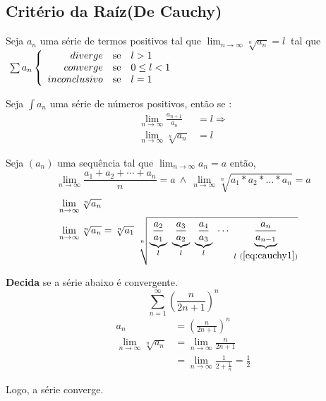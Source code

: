 \documentclass[12pt,openany, letterpaper]{book}
\begin{document}
\subsection{Critério da Raíz(De Cauchy)}

\hspace{5mm} Seja $a_n$ uma série de termos positivos tal que $\displaystyle{\lim_{n \rightarrow \infty} \sqrt[n]{a_n} = l}\  $ tal que $\ \sum a_n  \left\{ \begin{array}{rlll}
diverge & \hbox{se} &  l > 1 \\
converge & \hbox{se} & 0 \leq l < 1 \\
inconclusivo & \hbox{se} & l = 1 \\
\end{array}\right.$

Seja $\int a_n$ uma série de números positivos, então se :
\begin{align}
\lim_{n \rightarrow \infty} \frac{a_{n+1}}{a_n} &= l \Rightarrow \label{eq:cauchy1} \\
\lim_{n \rightarrow \infty} \sqrt[n]{a_n} &= l
\end{align}

Seja $(a_n)$ uma sequência tal que $\displaystyle{\lim_{n \rightarrow \infty} a_n = a}$ então,  $$\lim_{n \rightarrow \infty} \frac{a_1 + a_2 + \cdots + a_n}{n} = a \ \land \ \lim_{n \rightarrow \infty} \sqrt[n]{a_1 * a_2 * \hdots * a_n} = a$$
\begin{align*}
\lim_{n \rightarrow \infty} \sqrt[n]{a_n} \\
\lim_{n \rightarrow \infty} \sqrt[n]{a_n} &= \sqrt[n]{a_1} \ \sqrt[n]{\underbrace{\frac{a_2}{a_1}}_l\ \underbrace{\frac{a_3}{a_2}}_l \ \underbrace{\frac{a_4}{a_3}}_l \ \cdots \ \underbrace{\frac{a_n}{a_{n-1}}}_{l \ (\ref{eq:cauchy1})}}
\end{align*}

\textbf{Decida} se a série abaixo é convergente. $$\sum_{n = 1}^{\infty} \left( \frac{n}{2n+1}\right)^n$$
\begin{align*}
a_n &= \left( \frac{n}{2n+1}\right)^n \\
\lim_{n \rightarrow \infty} \sqrt[n]{a_n} &= \lim_{n \rightarrow \infty}\frac{n}{2n+1} \\
&= \lim_{n \rightarrow \infty}\frac{1}{2+\frac{1}{n}} = \frac{1}{2}
\end{align*}

Logo, a série converge.
\end{document}
